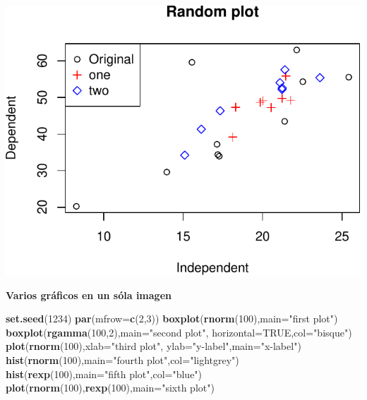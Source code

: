 \documentclass[]{article}
\newenvironment{Shaded}{\begin{snugshade}}{\end{snugshade}}
\newcommand{\KeywordTok}[1]{\textcolor[rgb]{0.13,0.29,0.53}{\textbf{{#1}}}}
\newcommand{\DataTypeTok}[1]{\textcolor[rgb]{0.13,0.29,0.53}{{#1}}}
\newcommand{\DecValTok}[1]{\textcolor[rgb]{0.00,0.00,0.81}{{#1}}}
\newcommand{\StringTok}[1]{\textcolor[rgb]{0.31,0.60,0.02}{{#1}}}
\newcommand{\OtherTok}[1]{\textcolor[rgb]{0.56,0.35,0.01}{{#1}}}
\newcommand{\NormalTok}[1]{{#1}}
\numberwithin{equation}{section}
\begin{document}
\includegraphics{tema1_files/figure-latex/unnamed-chunk-82-1.pdf}

\textbf{Varios gráficos en un sóla imagen}

\begin{Shaded}
\begin{Highlighting}[]
\KeywordTok{set.seed}\NormalTok{(}\DecValTok{1234}\NormalTok{)}
 \KeywordTok{par}\NormalTok{(}\DataTypeTok{mfrow=}\KeywordTok{c}\NormalTok{(}\DecValTok{2}\NormalTok{,}\DecValTok{3}\NormalTok{))}
 \KeywordTok{boxplot}\NormalTok{(}\KeywordTok{rnorm}\NormalTok{(}\DecValTok{100}\NormalTok{),}\DataTypeTok{main=}\StringTok{"first plot"}\NormalTok{)}
 \KeywordTok{boxplot}\NormalTok{(}\KeywordTok{rgamma}\NormalTok{(}\DecValTok{100}\NormalTok{,}\DecValTok{2}\NormalTok{),}\DataTypeTok{main=}\StringTok{"second plot"}\NormalTok{, }\DataTypeTok{horizontal=}\OtherTok{TRUE}\NormalTok{,}\DataTypeTok{col=}\StringTok{"bisque"}\NormalTok{)}
 \KeywordTok{plot}\NormalTok{(}\KeywordTok{rnorm}\NormalTok{(}\DecValTok{100}\NormalTok{),}\DataTypeTok{xlab=}\StringTok{"third plot"}\NormalTok{,}
      \DataTypeTok{ylab=}\StringTok{"y-label"}\NormalTok{,}\DataTypeTok{main=}\StringTok{"x-label"}\NormalTok{)}
 \KeywordTok{hist}\NormalTok{(}\KeywordTok{rnorm}\NormalTok{(}\DecValTok{100}\NormalTok{),}\DataTypeTok{main=}\StringTok{"fourth plot"}\NormalTok{,}\DataTypeTok{col=}\StringTok{"lightgrey"}\NormalTok{)}
 \KeywordTok{hist}\NormalTok{(}\KeywordTok{rexp}\NormalTok{(}\DecValTok{100}\NormalTok{),}\DataTypeTok{main=}\StringTok{"fifth plot"}\NormalTok{,}\DataTypeTok{col=}\StringTok{"blue"}\NormalTok{)}
 \KeywordTok{plot}\NormalTok{(}\KeywordTok{rnorm}\NormalTok{(}\DecValTok{100}\NormalTok{),}\KeywordTok{rexp}\NormalTok{(}\DecValTok{100}\NormalTok{),}\DataTypeTok{main=}\StringTok{"sixth plot"}\NormalTok{)}
\end{Highlighting}
\end{Shaded}
\end{document}
